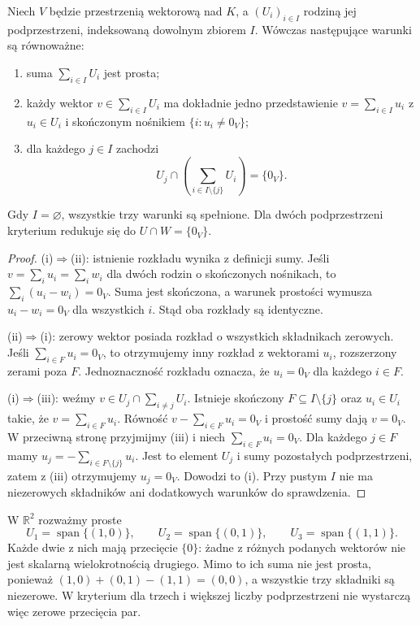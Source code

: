 \begin{twierdzenie}
\label{thm:lin2-kryteria-sumy-prostej}
Niech \(V\) będzie przestrzenią wektorową nad \(K\),
a \((U_i)_{i\in I}\) rodziną jej podprzestrzeni,
indeksowaną dowolnym zbiorem \(I\).
Wówczas następujące warunki są równoważne:
\begin{enumerate}[label=(\roman*)]
\item suma \(\sum_{i\in I}U_i\) jest prosta;
\item każdy wektor \(v\in\sum_{i\in I}U_i\)
ma dokładnie jedno przedstawienie
\(v=\sum_{i\in I}u_i\) z \(u_i\in U_i\)
i skończonym nośnikiem \(\{i:u_i\neq0_V\}\);
\item dla każdego \(j\in I\) zachodzi
\[
 U_j\cap\left(\sum_{i\in I\setminus\{j\}}U_i\right)
 =\{0_V\}.
\]
\end{enumerate}
Gdy \(I=\varnothing\), wszystkie trzy
warunki są spełnione.
Dla dwóch podprzestrzeni kryterium redukuje
się do \(U\cap W=\{0_V\}\).
\end{twierdzenie}
\begin{proof}
(i)\(\Rightarrow\)(ii): istnienie rozkładu
wynika z definicji sumy.
Jeśli \(v=\sum_i u_i=\sum_iw_i\)
dla dwóch rodzin o skończonych nośnikach,
to \(\sum_i(u_i-w_i)=0_V\).
Suma jest skończona, a warunek prostości
wymusza \(u_i-w_i=0_V\) dla wszystkich \(i\).
Stąd oba rozkłady są identyczne.

(ii)\(\Rightarrow\)(i): zerowy wektor
posiada rozkład o wszystkich składnikach zerowych.
Jeśli \(\sum_{i\in F}u_i=0_V\),
to otrzymujemy inny rozkład z wektorami \(u_i\),
rozszerzony zerami poza \(F\).
Jednoznaczność rozkładu oznacza,
że \(u_i=0_V\) dla każdego \(i\in F\).

(i)\(\Rightarrow\)(iii): weźmy
\(v\in U_j\cap\sum_{i\neq j}U_i\).
Istnieje skończony \(F\subseteq I\setminus\{j\}\)
oraz \(u_i\in U_i\) takie, że
\(v=\sum_{i\in F}u_i\).
Równość \(v-\sum_{i\in F}u_i=0_V\)
i prostość sumy dają \(v=0_V\).
W przeciwną stronę przyjmijmy (iii)
i niech \(\sum_{i\in F}u_i=0_V\).
Dla każdego \(j\in F\) mamy
\(u_j=-\sum_{i\in F\setminus\{j\}}u_i\).
Jest to element \(U_j\)
i sumy pozostałych podprzestrzeni,
zatem z (iii) otrzymujemy \(u_j=0_V\).
Dowodzi to (i).
Przy pustym \(I\) nie ma niezerowych składników
ani dodatkowych warunków do sprawdzenia.
\end{proof}

\begin{przyklad}
\label{prz:lin2-trzy-proste}
W \(\mathbb R^2\) rozważmy proste
\[
 U_1=\operatorname{span}\{(1,0)\},\qquad
 U_2=\operatorname{span}\{(0,1)\},\qquad
 U_3=\operatorname{span}\{(1,1)\}.
\]
Każde dwie z nich mają przecięcie \(\{0\}\):
żadne z różnych podanych wektorów
nie jest skalarną wielokrotnością drugiego.
Mimo to ich suma nie jest prosta, ponieważ
\((1,0)+(0,1)-(1,1)=(0,0)\),
a wszystkie trzy składniki są niezerowe.
W kryterium dla trzech i większej liczby
podprzestrzeni nie wystarczą więc
zerowe przecięcia par.
\end{przyklad}

